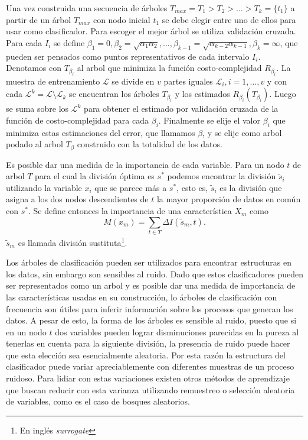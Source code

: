 \documentclass[letterpaper,12pt]{book}
\begin{document}
Una vez construida una secuencia de árboles $T_{max} = T_1>T_2>\dots>T_{k}=\{t_1\}$  a partir de un árbol $T_{max}$ con nodo inicial $t_1$ se debe elegir entre uno de ellos para usar como clasificador. Para escoger el mejor árbol se utiliza validación cruzada.  Para cada $I_i$ se define $\beta_1 = 0, \beta_2 = \sqrt{\alpha_1\alpha_2},\dots, \beta_{k-1} = \sqrt{\alpha_{k-2}\alpha_{k-1}},\beta_{k} = \infty$, que pueden ser pensados como puntos representativos de cada intervalo $I_i$. Denotamos con $T_{\beta_{i}}$ al arbol que minimiza la función costo-complejidad $R_{\beta_i}$.  La muestra de entrenamiento $\mathcal{L}$ se divide en $v$ partes iguales $\mathcal{L}_i,i=1,\dots,v$ y con cada $\mathcal{L}^k = \mathcal{L}\setminus \mathcal{L}_k$ se encuentran los árboles $T_{\beta_i}$ y los estimados $R_{\beta_i}(T_{\beta_i})$. Luego se suma sobre los $\mathcal{L}^k$ para obtener el estimado por validación cruzada de la función de costo-complejidad para cada $\beta_{i}$. Finalmente se elije el valor $\beta_i$ que minimiza estas estimaciones del error, que llamamos $\beta$, y se elije como arbol podado al  arbol $T_{\beta}$ construido con la totalidad de los datos.

Es posible dar una medida de la importancia de cada variable. Para un nodo $t$ de arbol $T$ para el cual la división óptima es $s^*$ podemos encontrar la división $\tilde{s}_i$ utilizando la variable $x_i$ que se parece más a $s^*$, esto es, $\tilde{s}_i$ es la división que asigna a los dos nodos descendientes de $t$ la mayor proporción de datos en común con $s^*$. Se define entonces la importancia de una característica $X_m$ como
\begin{equation}
M(x_m) =\sum_{t\in T} \Delta I(\tilde{s}_m,t).
\end{equation} 
$\tilde{s}_m$ es llamada división sustituta\footnote{En inglés \textit{surrogate}}.

 
Los árboles de clasificación pueden ser utilizados para encontrar estructuras en los datos, sin embargo son sensibles al ruido. Dado que estos clasificadores pueden ser representados como un arbol y es posible dar una medida de importancia de las características usadas en su construcción, lo árboles de clasificación con frecuencia son útiles para inferir información sobre los procesos que generan los datos. A pesar de esto, la forma de los árboles es sensible al ruido, puesto que si en un nodo $t$ dos variables pueden lograr disminuciones parecidas en la pureza al tenerlas en cuenta para la siguiente división, la presencia de ruido puede hacer que esta elección sea esencialmente aleatoria. Por esta razón la estructura del clasificador puede variar apreciablemente con diferentes muestras de un proceso ruidoso. Para lidiar con estas variaciones existen otros métodos de aprendizaje que buscan reducir con esta varianza utilizando remuestreo o selección aleatoria de variables, como es el caso de bosques aleatorios.
\end{document}
